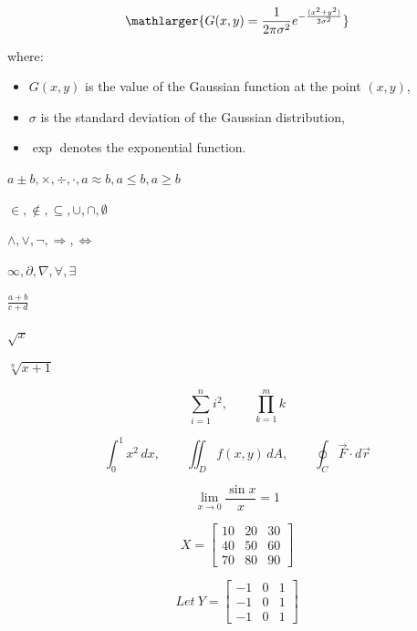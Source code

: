 \[
\mathlarger{G(x, y) = \frac{1}{2\pi\sigma^2} e^{-\frac{(x^2 + y^2 )}{2\sigma^2}}}
\]

where:
\begin{itemize}
    \item \(G(x, y)\) is the value of the Gaussian function at the point \((x, y)\),
    \item \(\sigma\) is the standard deviation of the Gaussian distribution,
    \item \(\exp\) denotes the exponential function.
\end{itemize}






$a \pm b, \times, \div, \cdot, a \approx b, a \le b, a \ge b$

$\in, \notin, \subseteq, \cup, \cap, \emptyset$

$\land, \lor, \lnot, \Rightarrow, \Leftrightarrow$

$\infty, \partial, \nabla, \forall, \exists$






$\frac{a+b}{c+d}$

$\sqrt{x}$

$\sqrt[n]{x+1}$


\[
  \sum_{i=1}^n i^2, \qquad \prod_{k=1}^m k
\]

\[
  \int_0^1 x^2 \, dx, \qquad \iint_{D} f(x,y)\, dA, \qquad \oint_C \vec{F}\cdot d\vec{r}
\]


\[
  \lim_{x\to 0}\frac{\sin x}{x} = 1
\]









\[
X = 
    \begin{bmatrix}
    10 & 20 & 30 \\
    40 & 50 & 60 \\
    70 & 80 & 90
    \end{bmatrix}
\] 
    
\[
Let ~Y = 
\begin{bmatrix}
-1 & 0 & 1 \\
-1 & 0 & 1 \\
-1 & 0 & 1
\end{bmatrix}
\] 

